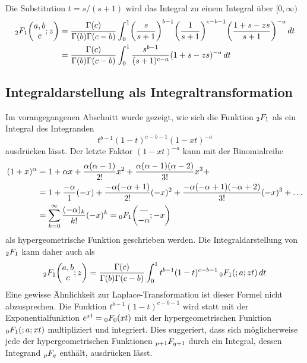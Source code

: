 Die Substitution $t=s/(s+1)$ wird das Integral zu einem Integral
über $[0,\infty)$
\begin{align*}
\mathstrut_2F_1\biggl(\begin{matrix}a,b\\c\end{matrix};z\biggr)
&=
\frac{\Gamma(c)}{\Gamma(b)\Gamma(c-b)}
\int_0^1
\biggl(\frac{s}{s+1}\biggr)^{b-1}
\biggl(\frac{1}{s+1}\biggr)^{c-b-1}
\biggl(\frac{1+s-zs}{s+1}\biggr)^{-a}
\,dt
\\
&=
\frac{\Gamma(c)}{\Gamma(b)\Gamma(c-b)}
\int_0^1
\frac{
s^{b-1}
}{
(s+1)^{c-a}
}
(1+s-zs)^{-a}
\,dt
\end{align*}

%
%
\subsection{Integraldarstellung als Integraltransformation}
Im vorangegangenen Abschnitt wurde gezeigt, wie sich die Funktion
$\mathstrut_2F_1$ als ein Integral des Integranden
\[
t^{b-1}(1-t)^{c-b-1} (1-xt)^{-a}
\]
ausdrücken lässt.
Der letzte Faktor $(1-xt)^{-a}$ kann mit der Binomialreihe
\begin{align*}
(1+x)^\alpha
&=
1
+ 
\alpha x
+
\frac{\alpha(\alpha-1)}{2!}x^2
+
\frac{\alpha(\alpha-1)(\alpha-2)}{3!}x^3
+
\\
&=
1
+
\frac{-\alpha}{1}(-x)
+
\frac{-\alpha(-\alpha+1)}{2!} (-x)^2
+
\frac{-\alpha(-\alpha+1)(-\alpha+2)}{3!} (-x)^3
+
\dots
\\
&=
\sum_{k=0}^\infty \frac{(-\alpha)_k}{k!} (-x)^k
=
\mathstrut_0F_1\biggl(
\begin{matrix}
\text{---}\\-\alpha
\end{matrix}
;-x
\biggr)
\end{align*}
als hypergeometrische Funktion geschrieben werden.
Die Integraldarstellung von $\mathstrut_2F_1$ kann daher auch als
\[
\mathstrut_2F_1\biggl(\begin{matrix}a,b\\c\end{matrix};z\biggr)
=
\frac{\Gamma(c)}{\Gamma(b)\Gamma(c-b)}
\int_0^1 t^{b-1}(1-t)^{c-b-1}
\,
\mathstrut_0F_1(;a;zt)\,dt
\]
Eine gewisse Ähnlichkeit zur Laplace-Transformation ist dieser
Formel nicht abzusprechen.
Die Funktion \( t^{b-1}(1-t)^{c-b-1} \) wird statt mit der
Exponentialfunktion $e^{xt} = \mathstrut_0F_0(xt)$ mit der
hypergeometrischen Funktion $\mathstrut_0F_1(;a;xt)$ multipliziert und
integriert.
Dies suggeriert, dass sich möglicherweise jede der hypergeometrischen
Funktionen $\mathstrut_{p+1}F_{q+1}$ durch ein Integral, dessen 
Integrand $\mathstrut_pF_q$ enthält, ausdrücken lässt.

